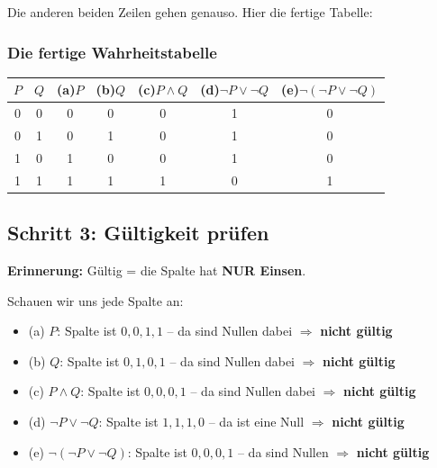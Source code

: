 \documentclass[a4paper,12pt]{article}
\begin{document}
\bigskip

Die anderen beiden Zeilen gehen genauso. Hier die fertige Tabelle:

\subsubsection*{Die fertige Wahrheitstabelle}

\begin{center}
\renewcommand{\arraystretch}{1.3}
\begin{tabular}{cc|ccccc}
\toprule
$P$ & $Q$
  & (a)\;$P$
  & (b)\;$Q$
  & (c)\;$P \wedge Q$
  & (d)\;$\neg P \vee \neg Q$
  & (e)\;$\neg(\neg P \vee \neg Q)$ \\
\midrule
0 & 0 & 0 & 0 & 0 & 1 & 0 \\
0 & 1 & 0 & 1 & 0 & 1 & 0 \\
1 & 0 & 1 & 0 & 0 & 1 & 0 \\
1 & 1 & 1 & 1 & 1 & 0 & 1 \\
\bottomrule
\end{tabular}
\end{center}

\subsection{Schritt 3: G\"ultigkeit pr\"ufen}

\begin{merkbox}
\textbf{Erinnerung:} G\"ultig = die Spalte hat \textbf{NUR Einsen}.
\end{merkbox}

Schauen wir uns jede Spalte an:
\begin{itemize}
\item (a) $P$: Spalte ist $0, 0, 1, 1$ -- da sind Nullen dabei $\Rightarrow$ \textbf{nicht g\"ultig}
\item (b) $Q$: Spalte ist $0, 1, 0, 1$ -- da sind Nullen dabei $\Rightarrow$ \textbf{nicht g\"ultig}
\item (c) $P \wedge Q$: Spalte ist $0, 0, 0, 1$ -- da sind Nullen dabei $\Rightarrow$ \textbf{nicht g\"ultig}
\item (d) $\neg P \vee \neg Q$: Spalte ist $1, 1, 1, 0$ -- da ist eine Null $\Rightarrow$ \textbf{nicht g\"ultig}
\item (e) $\neg(\neg P \vee \neg Q)$: Spalte ist $0, 0, 0, 1$ -- da sind Nullen $\Rightarrow$ \textbf{nicht g\"ultig}
\end{itemize}
\end{document}
